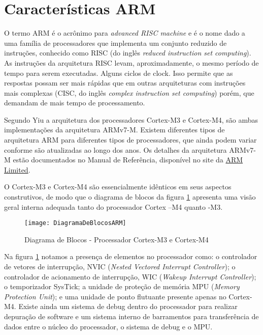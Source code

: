 \section{Características ARM}

O termo ARM é o acrônimo para \emph{advanced RISC machine} e é o nome dado a uma família de processadores que implementa um conjunto reduzido de instruções, conhecido como RISC (do inglês \emph{reduced instruction set computing}). As instruções da arquitetura RISC levam, aproximadamente, o mesmo período de tempo para serem executadas. Alguns ciclos de clock. Isso permite que as respostas possam ser mais rápidas que em outras arquiteturas com instruções mais complexas (CISC, do inglês \emph{complex instruction set computing}) porém, que demandam de mais tempo de processamento.

Segundo  Yiu \cite{ARMGUIDE} a arquitetura dos processadores Cortex-M3 e Cortex-M4, são ambas implementações da arquitetura ARMv7-M. Existem diferentes tipos de arquitetura ARM para diferentes tipos de processadores, que ainda podem variar conforme são atualizadas ao longo dos anos. Os detalhes da arquitetura ARMv7-M estão documentados no Manual de Referência, disponível no site da  \href{http://infocenter.arm.com/help/index.jsp}{ARM Limited}.

O Cortex-M3 e Cortex-M4 são essencialmente idênticos em seus aspectos construtivos, de modo que o diagrama de blocos da figura \ref{DiagramaDeBlocosARM}  apresenta uma visão  geral interna adequada tanto do processador Cortex –M4 quanto -M3.

\begin{figure}[h]
	\centering
	\texttt{[image: DiagramaDeBlocosARM]}
	\caption{Diagrama de Blocos - Processador Cortex-M3 e Cortex-M4 \cite{DATASHEET_TIVA}}
	\label{DiagramaDeBlocosARM}
\end{figure}

Na figura \ref{DiagramaDeBlocosARM} notamos a presença de elementos no processador como:  o controlador de vetores de interrupção, NVIC (\emph{Nested Vectored Interrupt Controller}); o controlador de acionamento de interrupção, WIC (\emph{Wakeup Interrupt Controller}); o temporizador SysTick; a unidade de proteção de memória MPU (\emph{Memory Protection Unit}); e uma unidade de ponto flutuante presente apenas no Cortex-M4. Existe ainda um sistema de debug dentro do processador para realizar depuração de software e um sistema interno de barramentos para transferência de dados entre o núcleo do processador, o sistema de debug e o MPU. 

